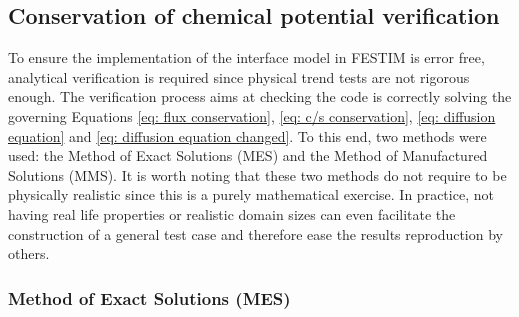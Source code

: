 \subsection{Conservation of chemical potential verification}
To ensure the implementation of the interface model in FESTIM is error free, analytical verification is required since physical trend tests are not rigorous enough. The verification process aims at checking the code is correctly solving the governing Equations \ref{eq: flux conservation}, \ref{eq: c/s conservation}, \ref{eq: diffusion equation} and \ref{eq: diffusion equation changed}.
To this end, two methods were used: the Method of Exact Solutions (MES) and the Method of Manufactured Solutions (MMS).
It is worth noting that these two methods do not require to be physically realistic since this is a purely mathematical exercise.
In practice, not having real life properties or realistic domain sizes can even facilitate the construction of a general test case and therefore ease the results reproduction by others.

\subsubsection{Method of Exact Solutions (MES)}

